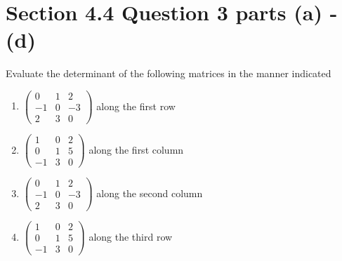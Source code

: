 \documentclass[13pt]{article}
\begin{document}
    \section*{Section 4.4 Question 3 parts (a) - (d)}
    Evaluate the determinant of the following matrices in the manner indicated
    \begin{enumerate}[label=(\alph*),leftmargin=*]
    \item $
      \begin{pmatrix}
        0 & 1 & 2 \\
        -1 & 0 & -3 \\
        2 & 3 & 0
      \end{pmatrix}
      $ along the first row
    \item $
      \begin{pmatrix}
        1 & 0 & 2 \\
        0 & 1 & 5 \\
        -1 & 3 & 0
      \end{pmatrix}
      $ along the first column
    \item $
      \begin{pmatrix}
        0 & 1 & 2 \\
        -1 & 0 & -3 \\
        2 & 3 & 0         
      \end{pmatrix}
      $ along the second column
    \item $
      \begin{pmatrix}
        1 & 0 & 2 \\
        0 & 1 & 5 \\
        -1 & 3 & 0
      \end{pmatrix}
      $ along the third row
    \end{enumerate}
\end{document}
